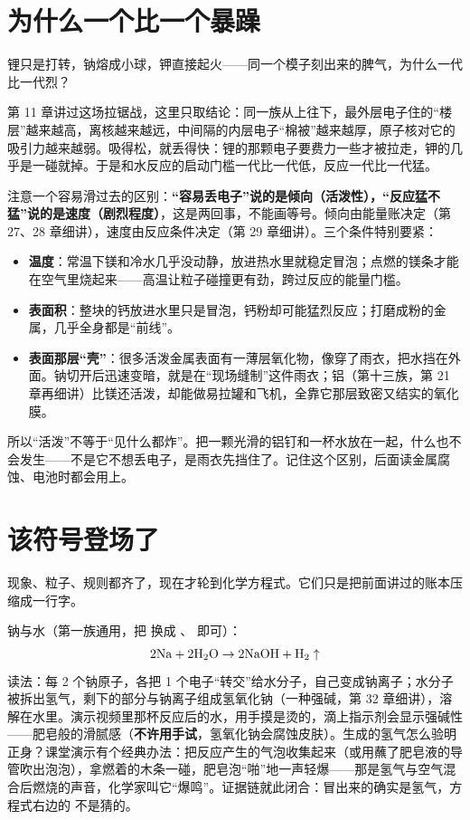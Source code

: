 \section{为什么一个比一个暴躁}

锂只是打转，钠熔成小球，钾直接起火——同一个模子刻出来的脾气，为什么一代比一代烈？

第 11 章讲过这场拉锯战，这里只取结论：同一族从上往下，最外层电子住的“楼层”越来越高，离核越来越远，中间隔的内层电子“棉被”越来越厚，原子核对它的吸引力越来越弱。吸得松，就丢得快：锂的那颗电子要费力一些才被拉走，钾的几乎是一碰就掉。于是和水反应的启动门槛一代比一代低，反应一代比一代猛。

注意一个容易滑过去的区别：\textbf{“容易丢电子”说的是倾向（活泼性），“反应猛不猛”说的是速度（剧烈程度）}，这是两回事，不能画等号。倾向由能量账决定（第 27、28 章细讲），速度由反应条件决定（第 29 章细讲）。三个条件特别要紧：

\begin{itemize}[itemsep=2pt]
\item \textbf{温度}：常温下镁和冷水几乎没动静，放进热水里就稳定冒泡；点燃的镁条才能在空气里烧起来——高温让粒子碰撞更有劲，跨过反应的能量门槛。
\item \textbf{表面积}：整块的钙放进水里只是冒泡，钙粉却可能猛烈反应；打磨成粉的金属，几乎全身都是“前线”。
\item \textbf{表面那层“壳”}：很多活泼金属表面有一薄层氧化物，像穿了雨衣，把水挡在外面。钠切开后迅速变暗，就是在“现场缝制”这件雨衣；铝（第十三族，第 21 章再细讲）比镁还活泼，却能做易拉罐和飞机，全靠它那层致密又结实的氧化膜。
\end{itemize}

所以“活泼”不等于“见什么都炸”。把一颗光滑的铝钉和一杯水放在一起，什么也不会发生——不是它不想丢电子，是雨衣先挡住了。记住这个区别，后面读金属腐蚀、电池时都会用上。

\section{该符号登场了}

现象、粒子、规则都齐了，现在才轮到化学方程式。它们只是把前面讲过的账本压缩成一行字。

钠与水（第一族通用，把  换成 、 即可）：
\[\mathrm{2Na} + \mathrm{2H_2O} \rightarrow \mathrm{2NaOH} + \mathrm{H_2}\uparrow\]
读法：每 2 个钠原子，各把 1 个电子“转交”给水分子，自己变成钠离子；水分子被拆出氢气，剩下的部分与钠离子组成氢氧化钠（一种强碱，第 32 章细讲），溶解在水里。演示视频里那杯反应后的水，用手摸是烫的，滴上指示剂会显示强碱性——肥皂般的滑腻感（\textbf{不许用手试}，氢氧化钠会腐蚀皮肤）。生成的氢气怎么验明正身？课堂演示有个经典办法：把反应产生的气泡收集起来（或用蘸了肥皂液的导管吹出泡泡），拿燃着的木条一碰，肥皂泡“啪”地一声轻爆——那是氢气与空气混合后燃烧的声音，化学家叫它“爆鸣”。证据链就此闭合：冒出来的确实是氢气，方程式右边的  不是猜的。

